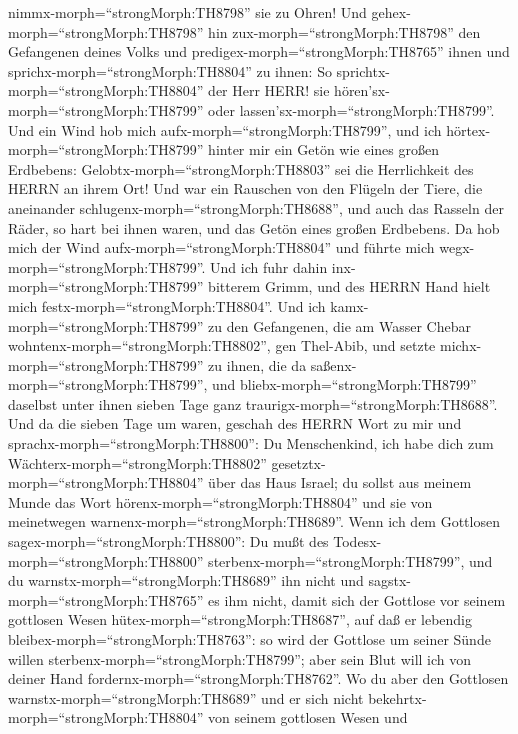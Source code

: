 nimmx-morph=``strongMorph:TH8798'' sie zu Ohren!  Und
gehex-morph=``strongMorph:TH8798'' hin zux-morph=``strongMorph:TH8798''
den Gefangenen deines Volks und predigex-morph=``strongMorph:TH8765''
ihnen und sprichx-morph=``strongMorph:TH8804'' zu ihnen: So
sprichtx-morph=``strongMorph:TH8804'' der Herr HERR! sie
hören'sx-morph=``strongMorph:TH8799'' oder
lassen'sx-morph=``strongMorph:TH8799''.  Und ein Wind hob
mich aufx-morph=``strongMorph:TH8799'', und ich
hörtex-morph=``strongMorph:TH8799'' hinter mir ein Getön wie eines
großen Erdbebens: Gelobtx-morph=``strongMorph:TH8803'' sei die
Herrlichkeit des HERRN an ihrem Ort!  Und war ein Rauschen
von den Flügeln der Tiere, die aneinander
schlugenx-morph=``strongMorph:TH8688'', und auch das Rasseln der Räder,
so hart bei ihnen waren, und das Getön eines großen Erdbebens.
 Da hob mich der Wind aufx-morph=``strongMorph:TH8804'' und
führte mich wegx-morph=``strongMorph:TH8799''. Und ich fuhr dahin
inx-morph=``strongMorph:TH8799'' bitterem Grimm, und des HERRN Hand
hielt mich festx-morph=``strongMorph:TH8804''.  Und ich
kamx-morph=``strongMorph:TH8799'' zu den Gefangenen, die am Wasser
Chebar wohntenx-morph=``strongMorph:TH8802'', gen Thel-Abib, und setzte
michx-morph=``strongMorph:TH8799'' zu ihnen, die da
saßenx-morph=``strongMorph:TH8799'', und
bliebx-morph=``strongMorph:TH8799'' daselbst unter ihnen sieben Tage
ganz traurigx-morph=``strongMorph:TH8688''.  Und da die
sieben Tage um waren, geschah des HERRN Wort zu mir und
sprachx-morph=``strongMorph:TH8800'':  Du Menschenkind, ich
habe dich zum Wächterx-morph=``strongMorph:TH8802''
gesetztx-morph=``strongMorph:TH8804'' über das Haus Israel; du sollst
aus meinem Munde das Wort hörenx-morph=``strongMorph:TH8804'' und sie
von meinetwegen warnenx-morph=``strongMorph:TH8689''.  Wenn
ich dem Gottlosen sagex-morph=``strongMorph:TH8800'': Du mußt des
Todesx-morph=``strongMorph:TH8800''
sterbenx-morph=``strongMorph:TH8799'', und du
warnstx-morph=``strongMorph:TH8689'' ihn nicht und
sagstx-morph=``strongMorph:TH8765'' es ihm nicht, damit sich der
Gottlose vor seinem gottlosen Wesen hütex-morph=``strongMorph:TH8687'',
auf daß er lebendig bleibex-morph=``strongMorph:TH8763'': so wird der
Gottlose um seiner Sünde willen sterbenx-morph=``strongMorph:TH8799'';
aber sein Blut will ich von deiner Hand
fordernx-morph=``strongMorph:TH8762''.  Wo du aber den
Gottlosen warnstx-morph=``strongMorph:TH8689'' und er sich nicht
bekehrtx-morph=``strongMorph:TH8804'' von seinem gottlosen Wesen und
